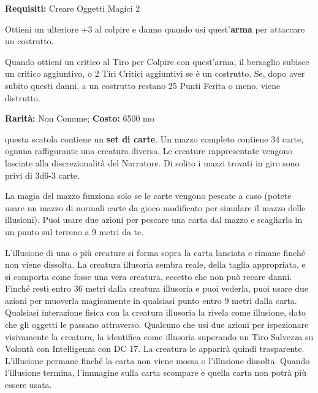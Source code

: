 \begin{multicols}{2}
\textbf{Requisiti:} Creare Oggetti Magici 2

Ottieni un ulteriore +3 al colpire e danno quando usi quest'\textbf{arma} per attaccare un costrutto.

Quando ottieni un critico al Tiro per Colpire con quest'arma, il bersaglio subisce un critico aggiuntivo, o 2 Tiri Critici aggiuntivi se è un costrutto. Se, dopo aver subito questi danni, a un costrutto restano 25 Punti Ferita o meno, viene distrutto.


\textbf{Rarità:} Non Comune; \textbf{Costo:} 6500 mo

questa scatola contiene un \textbf{set di carte}. Un mazzo completo contiene 34 carte, ognuna raffigurante una creatura diversa. Le creature rappresentate vengono lasciate alla discrezionalità del Narratore. Di solito i mazzi trovati in giro sono privi di 3d6-3 carte.

La magia del mazzo funziona solo se le carte vengono pescate a caso (potete usare un mazzo di normali carte da gioco modificato per simulare il mazzo delle illusioni). Puoi usare due azioni per pescare una carta dal mazzo e scagliarla in un punto sul terreno a 9 metri da te.

L'illusione di una o più creature si forma sopra la carta lanciata e rimane finché non viene dissolta. La creatura illusoria sembra reale, della taglia appropriata, e si comporta come fosse una vera creatura, eccetto che non può recare danni. Finché resti entro 36 metri dalla creatura illusoria e puoi vederla, puoi usare due azioni per muoverla magicamente in qualsiasi punto entro 9 metri dalla carta. Qualsiasi interazione fisica con la creatura illusoria la rivela come illusione, dato che gli oggetti le passano attraverso. Qualcuno che usi due azioni per ispezionare visivamente la creatura, la identifica come illusoria superando un Tiro Salvezza su Volontà con Intelligenza con DC 17. La creatura le apparirà quindi trasparente.
L'illusione permane finché la carta non viene mossa o l'illusione dissolta. Quando l'illusione termina, l'immagine sulla carta scompare e quella carta non potrà più essere usata.

\medskip


\end{multicols}
